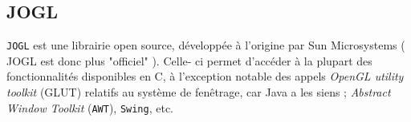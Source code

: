 \documentclass[11pt]{report}
\begin{document}

\subsection{JOGL}
 \texttt{JOGL} est une librairie open source, développée à l'origine par Sun Microsystems ( JOGL est donc plus "officiel" ).
Celle- ci permet d'accéder à la plupart des fonctionnalités disponibles en C, à l'exception notable des appels \textit{OpenGL utility toolkit} (GLUT) relatifs au système de fenêtrage, car Java a les siens ; \textit{Abstract Window Toolkit} (\texttt{AWT}), \texttt{Swing}, etc.
\end{document}

